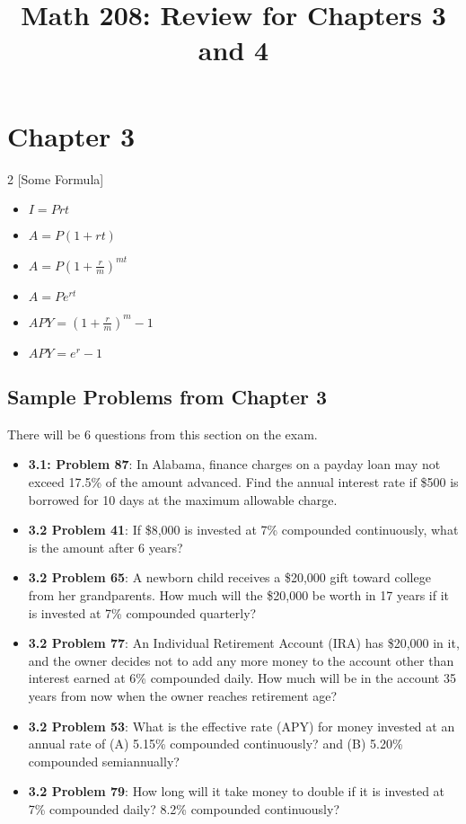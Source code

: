 \documentclass[12pt]{article}
\begin{document}
\title{\vspace{-10ex}Math 208: Review for Chapters 3 and 4}
\date{\vspace{-10ex}}
\maketitle

\section*{Chapter 3}
\begin{multicols}{2}
	[Some Formula]
	\begin{itemize}
		\item $I=Prt$
		\item $A=P(1+rt)$
		\item $A = P(1+ \frac{r}{m})^{mt}$
		\item $A = Pe^{rt}$
		\item $APY = (1 + \frac{r}{m})^m -1$
		\item $APY = e^r -1$
	\end{itemize}
\end{multicols}

\subsection*{Sample Problems from Chapter 3}
There will be 6 questions from this section on the exam.
\begin{itemize}
\item \textbf{3.1: Problem 87}: In Alabama, finance charges on a payday loan may not exceed 17.5\% of the amount advanced. Find the annual interest rate if \$500 is borrowed for 10 days at the maximum allowable charge.
\item \textbf{3.2 Problem 41}: If \$8,000 is invested at 7\% compounded continuously, what is the amount after 6 years?
\item \textbf{3.2 Problem 65}: A newborn child receives a \$20,000 gift toward college from her grandparents. How much will the \$20,000 be worth in 17 years if it is invested at 7\% compounded quarterly?
\item \textbf{3.2 Problem 77}:  An Individual Retirement Account (IRA) has \$20,000 in it, and the owner decides not to add any more money to the account other than interest earned at 6\% compounded daily. How much will be in the account 35 years from now when the owner reaches retirement age?
\item \textbf{3.2 Problem 53}: What is the effective rate (APY) for money invested at an annual rate of
(A) 5.15\% compounded continuously? and (B) 5.20\% compounded semiannually?
\item \textbf{3.2 Problem 79}: How long will it take money to double if it is invested at 7\% compounded daily? 8.2\% compounded continuously?


\end{itemize}
\end{document}
